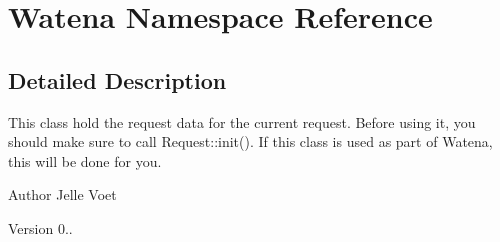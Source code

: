 \hypertarget{namespace_watena}{\section{Watena Namespace Reference}
\label{namespace_watena}
}


\subsection{Detailed Description}
This class hold the request data for the current request. Before using it, you should make sure to call Request\-::init(). If this class is used as part of Watena, this will be done for you.

\begin{DoxyAuthor}{Author}
Jelle Voet 
\end{DoxyAuthor}
\begin{DoxyVersion}{Version}
0.. 
\end{DoxyVersion}
